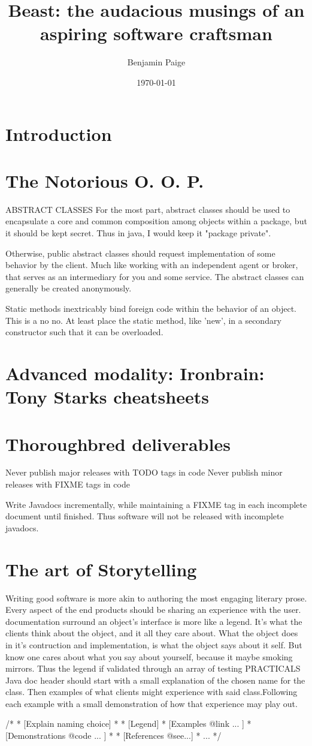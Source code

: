 \documentclass{article}
\title{Beast: the audacious musings of an aspiring software craftsman}
\author{Benjamin Paige}
\date{\today}
\begin{document}
\maketitle

\tableofcontents

\section{Introduction}

\section{The Notorious O. O. P.}
ABSTRACT CLASSES
For the most part, abstract classes should be used to encapsulate a core and common composition among objects within a package, but it should be kept secret.
Thus in java, I would keep it "package private".

Otherwise, public abstract classes should request implementation of some behavior by the client.
Much like working with an independent agent or broker, that serves as an intermediary for you and some service.
The abstract classes can generally be created anonymously. 

Static methods inextricably bind foreign code within the behavior of an object. This is a no no.  At least place the static method, like 'new', in a secondary constructor such that it can be overloaded.

\section{Advanced modality: Ironbrain: Tony Starks cheatsheets}

\section{Thoroughbred deliverables}
Never publish major releases with TODO tags in code
Never publish minor releases with FIXME tags in code

Write Javadocs incrementally, while maintaining a FIXME tag in each incomplete document until finished. 
Thus software will not be released with incomplete javadocs.

\section{The art of Storytelling}
Writing good software is more akin to authoring the most engaging literary prose. Every aspect of the end products should be sharing an experience with the user.
documentation surround an object's interface is more like a legend.  It's what the clients think about the object, and it all they care about.  What the object does in it's contruction and implementation, is what the object says about it self.  But know one cares about what you say about yourself, because it maybe smoking mirrors.  Thus the legend if validated through an array of testing
PRACTICALS
Java doc header should start with a small explanation of the chosen name for the class.  Then examples of what clients might experience with said class.Following each example with a small demonstration of how that experience may play out.

/*
 * [Explain naming choice]
 *
 * [Legend]
 *		[Examples {@link} ... ]
 *			[Demonstrations {@code} ... ]
 *
 * [References @see...]
 * ...
 */
\end{document}
